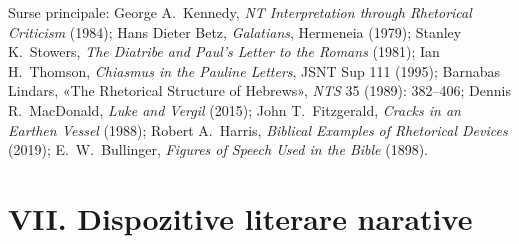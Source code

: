 \documentclass[12pt,a4paper,twoside,openany]{book}
\begin{document}
\vspace{10pt}
\noindent\small Surse principale: George A.\ Kennedy, \textit{NT Interpretation through Rhetorical Criticism} (1984); Hans Dieter Betz, \textit{Galatians}, Hermeneia (1979); Stanley K.\ Stowers, \textit{The Diatribe and Paul's Letter to the Romans} (1981); Ian H.\ Thomson, \textit{Chiasmus in the Pauline Letters}, JSNT Sup 111 (1995); Barnabas Lindars, «The Rhetorical Structure of Hebrews», \textit{NTS} 35 (1989): 382--406; Dennis R.\ MacDonald, \textit{Luke and Vergil} (2015); John T.\ Fitzgerald, \textit{Cracks in an Earthen Vessel} (1988); Robert A.\ Harris, \textit{Biblical Examples of Rhetorical Devices} (2019); E.\ W.\ Bullinger, \textit{Figures of Speech Used in the Bible} (1898).
\normalsize

\section*{VII. Dispozitive literare narative}
\end{document}
